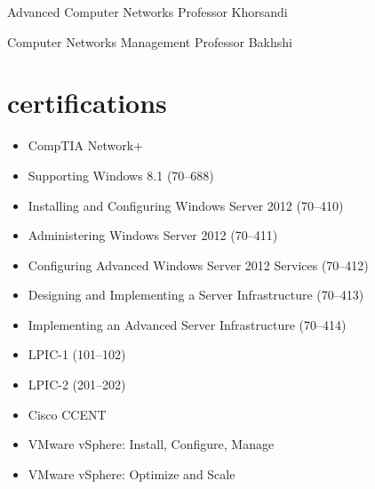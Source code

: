 \documentclass[]{friggeri-cv} %
\begin{document}
\begin{entrylist}

	{Advanced Computer Networks}
	{Professor Khorsandi}
	{}


	{Computer Networks Management}
	{Professor Bakhshi}
	{}



\end{entrylist}
\pagebreak


\section{certifications}
\begin{itemize}
	\item CompTIA Network+
	\item Supporting Windows 8.1 (70--688)
	\item Installing and Configuring Windows Server 2012 (70--410)
	\item Administering Windows Server 2012 (70--411)
	\item Configuring Advanced Windows Server 2012 Services (70--412)
	\item Designing and Implementing a Server Infrastructure (70--413)
	\item Implementing an Advanced Server Infrastructure (70--414)
	\item LPIC-1 (101--102)
	\item LPIC-2 (201--202)
	\item Cisco CCENT
	\item VMware vSphere: Install, Configure, Manage
	\item VMware vSphere: Optimize and Scale
\end{itemize}
\end{document}
